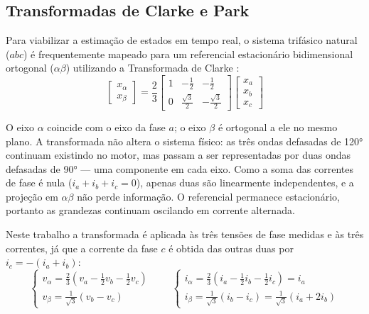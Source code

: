 \subsection{Transformadas de Clarke e Park}
\label{sec:clarke_park}

Para viabilizar a estimação de estados em tempo real, o sistema trifásico natural ($abc$) é frequentemente mapeado para um referencial estacionário bidimensional ortogonal ($\alpha\beta$) utilizando a Transformada de Clarke \cite{Clarke1943}:
\begin{equation}
    \begin{bmatrix} x_\alpha \\ x_\beta \end{bmatrix}
    = \frac{2}{3}
    \begin{bmatrix} 1 & -\frac{1}{2} & -\frac{1}{2} \\
    0 & \frac{\sqrt{3}}{2} & -\frac{\sqrt{3}}{2} \end{bmatrix}
    \begin{bmatrix} x_a \\ x_b \\ x_c \end{bmatrix}
    \label{eq:clarke}
\end{equation}

O eixo $\alpha$ coincide com o eixo da fase $a$; o eixo $\beta$ é ortogonal a ele no mesmo plano. A transformada não altera o sistema físico: as três ondas defasadas de 120° continuam existindo no motor, mas passam a ser representadas por duas ondas defasadas de 90° — uma componente em cada eixo. Como a soma das correntes de fase é nula ($i_a + i_b + i_c = 0$), apenas duas são linearmente independentes, e a projeção em $\alpha\beta$ não perde informação. O referencial permanece estacionário, portanto as grandezas continuam oscilando em corrente alternada.

Neste trabalho a transformada é aplicada às três tensões de fase medidas e às
três correntes, já que a corrente da fase $c$ é obtida das outras duas por
$i_c = -(i_a + i_b)$:
\begin{equation}
    \begin{cases}
        v_\alpha = \frac{2}{3}\left(v_a - \frac{1}{2} v_b - \frac{1}{2} v_c\right) \\[2pt]
        v_\beta = \frac{1}{\sqrt{3}} \left(v_b - v_c\right)
    \end{cases}
    \qquad
    \begin{cases}
        i_\alpha = \frac{2}{3}\left(i_a - \frac{1}{2} i_b - \frac{1}{2} i_c\right) = i_a \\[2pt]
        i_\beta = \frac{1}{\sqrt{3}} \left(i_b - i_c\right) = \frac{1}{\sqrt{3}} (i_a + 2i_b)
    \end{cases}
    \label{eq:tensao_alphabeta}
\end{equation}

